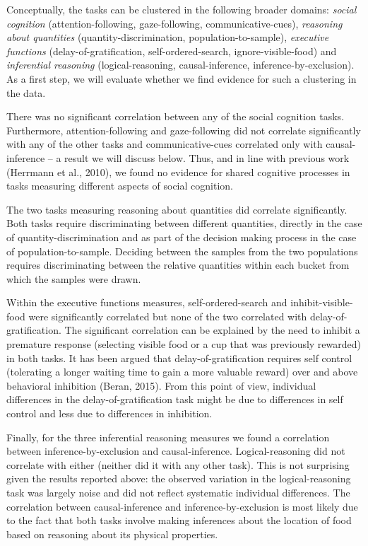 \documentclass[
  man,floatsintext]{apa6}
\begin{document}
Conceptually, the tasks can be clustered in the following broader domains: \emph{social cognition} (attention-following, gaze-following, communicative-cues), \emph{reasoning about quantities} (quantity-discrimination, population-to-sample), \emph{executive functions} (delay-of-gratification, self-ordered-search, ignore-visible-food) and \emph{inferential reasoning} (logical-reasoning, causal-inference, inference-by-exclusion). As a first step, we will evaluate whether we find evidence for such a clustering in the data.

There was no significant correlation between any of the social cognition tasks. Furthermore, attention-following and gaze-following did not correlate significantly with any of the other tasks and communicative-cues correlated only with causal-inference -- a result we will discuss below. Thus, and in line with previous work (Herrmann et al., 2010), we found no evidence for shared cognitive processes in tasks measuring different aspects of social cognition.

The two tasks measuring reasoning about quantities did correlate significantly. Both tasks require discriminating between different quantities, directly in the case of quantity-discrimination and as part of the decision making process in the case of population-to-sample. Deciding between the samples from the two populations requires discriminating between the relative quantities within each bucket from which the samples were drawn.

Within the executive functions measures, self-ordered-search and inhibit-visible-food were significantly correlated but none of the two correlated with delay-of-gratification. The significant correlation can be explained by the need to inhibit a premature response (selecting visible food or a cup that was previously rewarded) in both tasks. It has been argued that delay-of-gratification requires self control (tolerating a longer waiting time to gain a more valuable reward) over and above behavioral inhibition (Beran, 2015). From this point of view, individual differences in the delay-of-gratification task might be due to differences in self control and less due to differences in inhibition.

Finally, for the three inferential reasoning measures we found a correlation between inference-by-exclusion and causal-inference. Logical-reasoning did not correlate with either (neither did it with any other task). This is not surprising given the results reported above: the observed variation in the logical-reasoning task was largely noise and did not reflect systematic individual differences. The correlation between causal-inference and inference-by-exclusion is most likely due to the fact that both tasks involve making inferences about the location of food based on reasoning about its physical properties.
\end{document}
